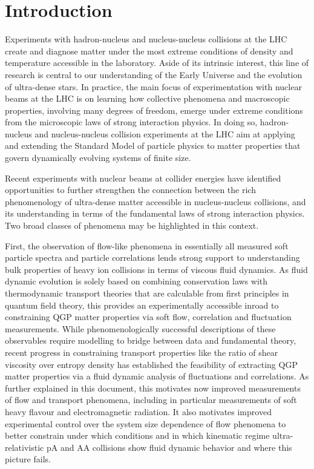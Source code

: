 \documentclass[../report.tex]{subfiles}
\begin{document}
\section{Introduction}

Experiments with hadron-nucleus and nucleus-nucleus collisions at the LHC create and diagnose matter under the most extreme conditions of density and temperature accessible in the laboratory. Aside of its intrinsic interest, this line of research is central to our understanding of the Early Universe and the evolution of ultra-dense stars. In practice, the main focus of experimentation with nuclear beams at the LHC is on learning how collective phenomena and macroscopic properties, involving many degrees of freedom, emerge under extreme conditions from the microscopic laws of strong interaction physics. In doing so, hadron-nucleus and nucleus-nucleus collision experiments at the LHC aim at applying and extending the Standard Model of particle physics to matter properties that govern dynamically evolving systems of finite size.

Recent experiments with nuclear beams at collider energies have identified opportunities to further strengthen the connection between the rich phenomenology of ultra-dense matter accessible in nucleus-nucleus collisions, and its understanding in terms of the fundamental laws of strong interaction physics. Two broad classes of phenomena may be highlighted in this context.

First, the observation of flow-like phenomena in essentially all measured soft particle spectra and particle correlations lends strong support to understanding bulk properties of heavy ion collisions in terms of viscous fluid dynamics. As fluid dynamic evolution is solely based on combining conservation laws with thermodynamic transport theories that are calculable from first principles in quantum field theory, this provides an experimentally accessible inroad to constraining QGP matter properties via soft flow, correlation and fluctuation measurements. While phenomenologically successful descriptions of these observables require modelling to bridge between data and fundamental theory, recent progress in constraining transport properties like the ratio of shear viscosity over entropy density has established the feasibility of extracting QGP matter properties via a fluid dynamic analysis of fluctuations and correlations. As further explained in this document, this motivates now improved measurements of flow and transport phenomena, including in particular measurements of soft heavy flavour and electromagnetic radiation.  It also motivates improved experimental control over the system size dependence of flow phenomena to better constrain under which conditions and in which kinematic regime ultra-relativistic pA and AA collisions show fluid dynamic behavior and where this picture fails.
\end{document}
